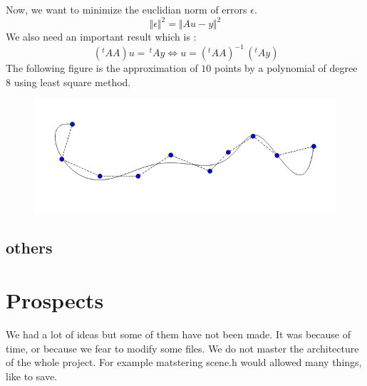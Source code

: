 \documentclass{article}
\begin{document}
 Now, we want to minimize the euclidian norm of errors $\epsilon$.
 \[  
 	\Vert \epsilon \Vert^2 = \Vert Au - y \Vert^2
 \]
 We also need an important result which is : 
 \[ \,(^tAA)u = \,^tAy \iff u =  (^tAA)^{-1}\,(^tAy)\] 
 The following figure is the approximation of $10$ points by a polynomial of degree $8$ using
 least square method.
 \begin{figure}[H]
	\center
   \includegraphics[scale = 0.4]{Pictures/sq1.png}
\end{figure}
\subsection*{others} %
\section*{Prospects}
We had a lot of ideas but some of them have not been made. It was because of time, or because we fear to modify some files. We do not master the architecture of the whole project. For example matstering scene.h would allowed many things, like to save. 
\end{document}
